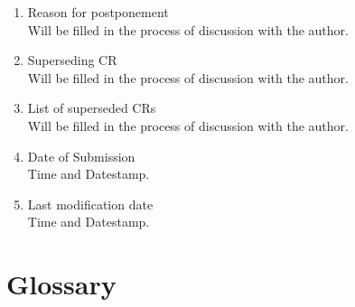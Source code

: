 \documentclass{template/openetcs_article}
\begin{document}
\begin{enumerate}
\item Reason for postponement\\
Will be filled in the process of discussion with the author.
\item Superseding CR\\
Will be filled in the process of discussion with the author.
\item List of superseded CRs\\
Will be filled in the process of discussion with the author.
\item Date of Submission\\
Time and Datestamp.
\item Last modification date\\
Time and Datestamp.

\end{enumerate}






\section{Glossary}
\end{document}

